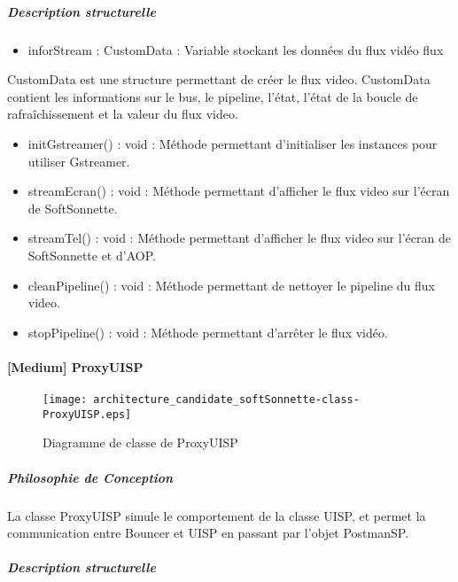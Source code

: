         \subparagraph{Description structurelle}%

            \begin{itemize}
                \item {inforStream : CustomData : Variable stockant les données du flux vidéo flux}
            \end{itemize}

            CustomData est une structure permettant de créer le flux video.
            CustomData contient les informations sur le bus, le pipeline, l'état, l'état de la boucle de rafraîchissement et la valeur du flux video.

            \begin{itemize}
                \item {initGstreamer() : void : Méthode permettant d'initialiser les instances pour utiliser Gstreamer.}
                \item {streamEcran() : void : Méthode permettant d'afficher le flux video sur l'écran de SoftSonnette.}
                \item {streamTel() : void : Méthode permettant d'afficher le flux video sur l'écran de SoftSonnette et d'AOP.}
                \item {cleanPipeline() : void : Méthode permettant de nettoyer le pipeline du flux video.}
                \item {stopPipeline() : void : Méthode permettant d'arrêter le flux vidéo.}
            \end{itemize}

\newpage 

    \paragraph{[Medium] ProxyUISP}

        \begin{figure} [H]
            \centering
            \texttt{[image: architecture\_candidate\_softSonnette-class-ProxyUISP.eps]}
            \caption{Diagramme de classe de ProxyUISP}
            \label{Classe-UISP}
        \end{figure}
    
            \subparagraph{Philosophie de Conception}%
                
            La classe ProxyUISP simule le comportement de la classe UISP, et permet la communication entre Bouncer et UISP en passant par l'objet PostmanSP.                      
            \subparagraph{Description structurelle}%
                
